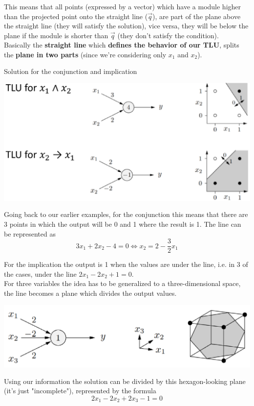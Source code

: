\documentclass[11pt]{article}
\begin{document}
		This means that all points (expressed by a vector) which have a module higher than the projected point onto the straight line ($\vec{q}$), are part of the plane above the straight line (they will satisfy the solution), vice versa, they will be below the plane if the module is shorter than $\vec{q}$ (they don't satisfy the condition).\\
		
		Basically the \textbf{straight line} which \textbf{defines the behavior of our TLU}, splits the \textbf{plane in two parts} (since we're considering only $x_1$ and $x_2$).\\
		
		\newpage
		
		Solution for the conjunction and implication
		\begin{center}
			\includegraphics[width=0.95\columnwidth]{img/NN/TLU5}
		\end{center}
		
		Going back to our earlier examples, for the conjunction this means that there are 3 points in which the output will be 0 and 1 where the result is 1. The line can be represented as 
		$$ 3 x_1 + 2 x_2 - 4 = 0 \Leftrightarrow x_2 = 2 - \frac{3}{2} x_1 $$
		
		For the implication the output is 1 when the values are under the line, i.e. in 3 of the cases, under the line $2 x_1 - 2 x_2 + 1 = 0$.\\
		
		For three variables the idea has to be generalized to a three-dimensional space, the line becomes a plane which divides the output values.
		\begin{center}
			\includegraphics[width=0.85\columnwidth]{img/NN/TLU6}
		\end{center}
		Using our information the solution can be divided by this hexagon-looking plane (it's just "incomplete"), represented by the formula 
		$$ 2x_1 -2x_2 +2x_3 -1 = 0 $$
		
\end{document}
